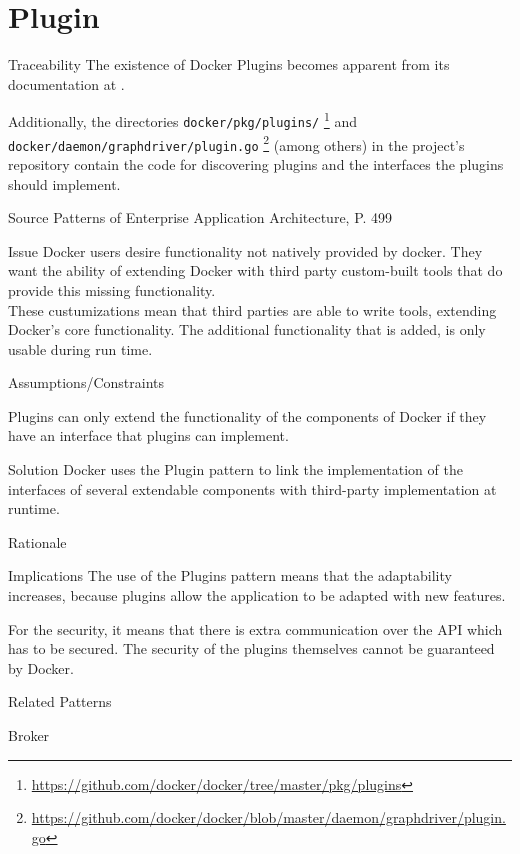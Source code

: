 \section{Plugin}
\label{sec:pattern-plugin}
\begin{patdescription}

\item [Traceability]
The existence of Docker Plugins becomes apparent from its documentation at \cite{dockerplugindocs}.

Additionally, the directories \verb|docker/pkg/plugins/| \footnote{\url{https://github.com/docker/docker/tree/master/pkg/plugins}} and \verb|  docker/daemon/graphdriver/plugin.go| \footnote{\url{https://github.com/docker/docker/blob/master/daemon/graphdriver/plugin.go}} (among others) in the project's repository contain the code for discovering plugins and the interfaces the plugins should implement.

\item [Source]
Patterns of Enterprise Application Architecture, P. 499 \cite{eaa}

\item [Issue]
Docker users desire functionality not natively provided by docker. They want the ability of extending Docker with third party custom-built tools that do provide this missing functionality. \\
These custumizations mean that third parties are able to write tools, extending Docker's core functionality\cite{dockerpluginblog}.
The additional functionality that is added, is only usable during run time.


\item [Assumptions/Constraints]
\begin{mynesteditemlist}
\item Plugins can only extend the functionality of the components of Docker if they have an interface that plugins can implement.
\end{mynesteditemlist}

\item [Solution]
Docker uses the Plugin pattern to link the implementation of the interfaces of several extendable components with third-party implementation at runtime.

\item [Rationale]  %

\item [Implications]
The use of the Plugins pattern means that the adaptability increases, because plugins allow the application to be adapted with new features.

For the security, it means that there is extra communication over the API which has to be secured. The security of the plugins themselves cannot be guaranteed by Docker.

\item [Related Patterns]
\begin{mynesteditemlist}
\item Broker
\end{mynesteditemlist}
\end{patdescription}

